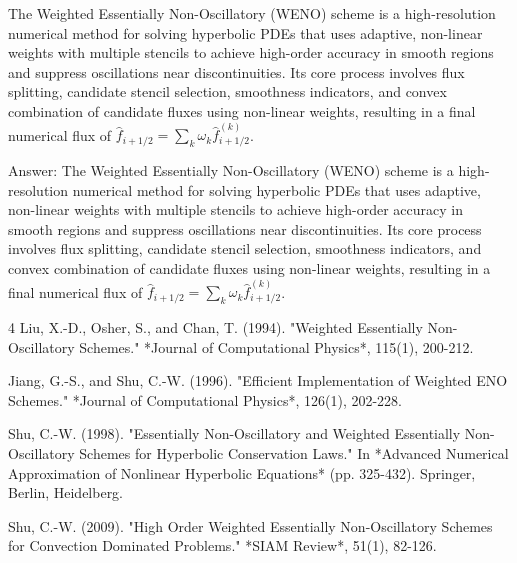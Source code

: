 \documentclass[10pt,a4paper]{article}
\begin{document}
The Weighted Essentially Non-Oscillatory (WENO) scheme is a high-resolution numerical method for solving hyperbolic PDEs that uses adaptive, non-linear weights with multiple stencils to achieve high-order accuracy in smooth regions and suppress oscillations near discontinuities. Its core process involves flux splitting, candidate stencil selection, smoothness indicators, and convex combination of candidate fluxes using non-linear weights, resulting in a final numerical flux of \(\hat{f}_{i+1/2} = \sum_{k} \omega_k \hat{f}_{i+1/2}^{(k)}\).


Answer: The Weighted Essentially Non-Oscillatory (WENO) scheme is a high-resolution numerical method for solving hyperbolic PDEs that uses adaptive, non-linear weights with multiple stencils to achieve high-order accuracy in smooth regions and suppress oscillations near discontinuities. Its core process involves flux splitting, candidate stencil selection, smoothness indicators, and convex combination of candidate fluxes using non-linear weights, resulting in a final numerical flux of \(\hat{f}_{i+1/2} = \sum_{k} \omega_k \hat{f}_{i+1/2}^{(k)}\).

\begin{thebibliography}{4}
Liu, X.-D., Osher, S., and Chan, T. (1994). "Weighted Essentially Non-Oscillatory Schemes." *Journal of Computational Physics*, 115(1), 200-212.

Jiang, G.-S., and Shu, C.-W. (1996). "Efficient Implementation of Weighted ENO Schemes." *Journal of Computational Physics*, 126(1), 202-228.

 
 Shu, C.-W. (1998). "Essentially Non-Oscillatory and Weighted Essentially Non-Oscillatory Schemes for Hyperbolic Conservation Laws." In *Advanced Numerical Approximation of Nonlinear Hyperbolic Equations* (pp. 325-432). Springer, Berlin, Heidelberg.


Shu, C.-W. (2009). "High Order Weighted Essentially Non-Oscillatory Schemes for Convection Dominated Problems." *SIAM Review*, 51(1), 82-126.

\end{thebibliography}
\end{document}
